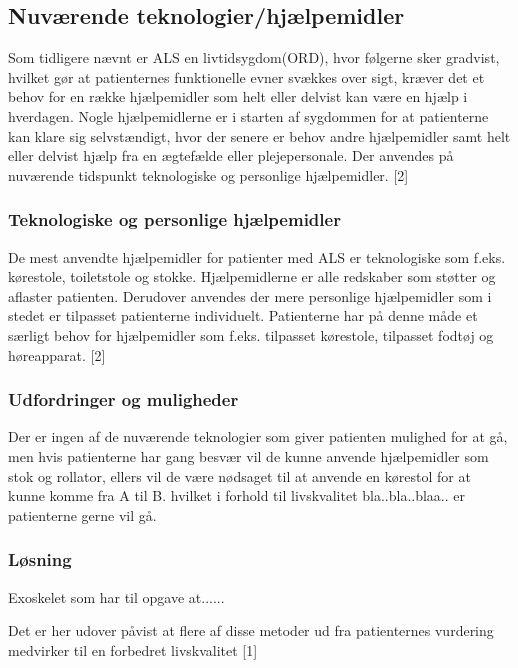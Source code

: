 \subsection{Nuværende teknologier/hjælpemidler}
Som tidligere nævnt er ALS en livtidsygdom(ORD), hvor følgerne sker gradvist, hvilket gør at patienternes funktionelle evner svækkes over sigt, kræver det et behov for en række hjælpemidler som helt eller delvist kan være en hjælp i hverdagen. Nogle hjælpemidlerne er i starten af sygdommen for at patienterne kan klare sig selvstændigt, hvor der senere er behov andre hjælpemidler samt helt eller delvist hjælp fra en ægtefælde eller plejepersonale. Der anvendes på nuværende tidspunkt teknologiske og personlige hjælpemidler. [2]

\subsubsection{Teknologiske og personlige hjælpemidler}
De mest anvendte hjælpemidler for patienter med ALS er teknologiske som f.eks.  kørestole, toiletstole og stokke. Hjælpemidlerne er alle redskaber som støtter og aflaster patienten. Derudover anvendes der mere personlige hjælpemidler som i stedet er tilpasset patienterne individuelt. Patienterne har på denne måde et særligt behov for hjælpemidler som f.eks. tilpasset kørestole, tilpasset fodtøj og høreapparat. [2]

\subsubsection{Udfordringer og muligheder}
Der er ingen af de nuværende teknologier som giver patienten mulighed for at gå, men hvis patienterne har gang besvær vil de kunne anvende hjælpemidler som stok og rollator, ellers vil de være nødsaget til at anvende en kørestol for at kunne komme fra A til B. hvilket i forhold til livskvalitet bla..bla..blaa.. er patienterne gerne vil gå.


\subsubsection{Løsning}
Exoskelet som har til opgave at......




Det er her udover påvist at flere af disse metoder ud fra patienternes vurdering medvirker til en forbedret livskvalitet [1]

